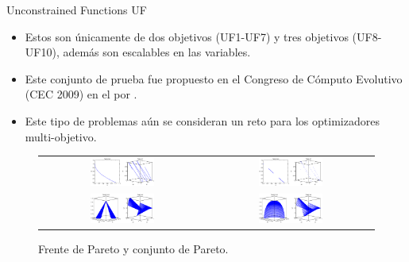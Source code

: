 \documentclass{beamer}
\begin{document}
\begin{frame}{Unconstrained Functions UF}
\begin{itemize}
\scriptsize
   \item Estos son únicamente de dos objetivos (UF1-UF7) y tres objetivos (UF8-UF10), además son escalables en las variables.
   \item Este conjunto de prueba fue propuesto en el Congreso de Cómputo Evolutivo (CEC 2009) en el \citeyear{Joel:CEC2009} por \citeauthor{Joel:CEC2009}.
   \item Este tipo de problemas aún se consideran un reto para los optimizadores multi-objetivo.
\end{itemize}
\begin{figure}[H]
\begin{tabular}{c c}
\includegraphics[width=0.4\textwidth]{UF1.eps}     &  \includegraphics[width=0.4\textwidth]{UF6.eps} \\
\includegraphics[width=0.4\textwidth]{UF9.eps}     &  \includegraphics[width=0.4\textwidth]{UF10.eps} \\
\end{tabular}
\centering
\caption{\scriptsize Frente de Pareto y conjunto de Pareto.}
\end{figure}

\end{frame}
\end{document}
